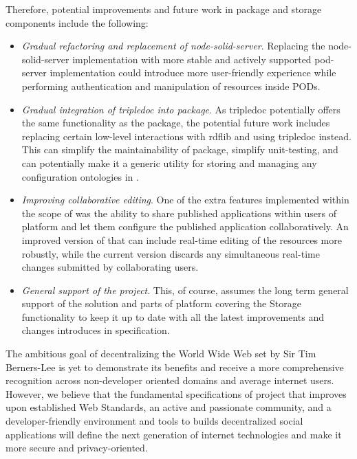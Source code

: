 Therefore, potential improvements and future work in \lpas{} package and storage components include the following:
\begin{itemize}
    \item \textit{Gradual refactoring and replacement of node-solid-server}. Replacing the node-solid-server implementation with more stable and actively supported pod-server implementation could introduce more user-friendly experience while performing authentication and manipulation of resources inside PODs.
    \item \textit{Gradual integration of tripledoc into \lpas{} package}. As tripledoc potentially offers the same functionality as the \lpas{} package, the potential future work includes replacing certain low-level interactions with rdflib and using tripledoc instead. This can simplify the maintainability of \lpas{} package, simplify unit-testing, and can potentially make it a generic utility for storing and managing any configuration ontologies in \solid{}.
    \item \textit{Improving collaborative editing}. One of the extra features implemented within the scope of \lpas{} was the ability to share published applications within users of \lpa{} platform and let them configure the published application collaboratively. An improved version of that can include real-time editing of the resources more robustly, while the current version discards any simultaneous real-time changes submitted by collaborating users.
    \item \textit{General support of the project}. This, of course, assumes the long term general support of the solution and parts of \lpa{} platform covering the Storage functionality to keep it up to date with all the latest improvements and changes introduces in \solid{} specification.
\end{itemize}

The ambitious goal of decentralizing the World Wide Web set by Sir Tim Berners-Lee is yet to demonstrate its benefits and receive a more comprehensive recognition across non-developer oriented domains and average internet users. However, we believe that the fundamental specifications of \solid{} project that improves upon established Web Standards, an active and passionate community, and a developer-friendly environment and tools to builds decentralized social applications will define the next generation of internet technologies and make it more secure and privacy-oriented.